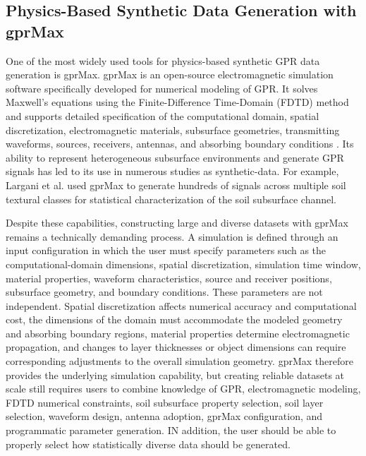 \documentclass[journal]{IEEEtran}
\begin{document}
\subsection{Physics-Based Synthetic Data Generation with gprMax}

One of the most widely used tools for physics-based synthetic GPR data generation is gprMax. gprMax is an open-source electromagnetic simulation software specifically developed for numerical modeling of GPR. It solves Maxwell's equations using the Finite-Difference Time-Domain (FDTD) method and supports detailed specification of the computational domain, spatial discretization, electromagnetic materials, subsurface geometries, transmitting waveforms, sources, receivers, antennas, and absorbing boundary conditions \cite{warren2016gprmax}. Its ability to represent heterogeneous subsurface environments and generate GPR signals has led to its use in numerous studies as synthetic-data. For example, Largani et al.\cite{} used gprMax to generate hundreds of signals across multiple soil textural classes for statistical characterization of the soil subsurface channel.

Despite these capabilities, constructing large and diverse datasets with gprMax remains a technically demanding process. A simulation is defined through an input configuration in which the user must specify parameters such as the computational-domain dimensions, spatial discretization, simulation time window, material properties, waveform characteristics, source and receiver positions, subsurface geometry, and boundary conditions. These parameters are not independent. Spatial discretization affects numerical accuracy and computational cost, the dimensions of the domain must accommodate the modeled geometry and absorbing boundary regions, material properties determine electromagnetic propagation, and changes to layer thicknesses or object dimensions can require corresponding adjustments to the overall simulation geometry. gprMax therefore provides the underlying simulation capability, but creating reliable datasets at scale still requires users to combine knowledge of GPR, electromagnetic modeling, FDTD numerical constraints, soil subsurface property selection, soil layer selection, waveform design, antenna adoption, gprMax configuration, and programmatic parameter generation. IN addition, the user should be able to properly select how statistically diverse data should be generated. 

\end{document}
